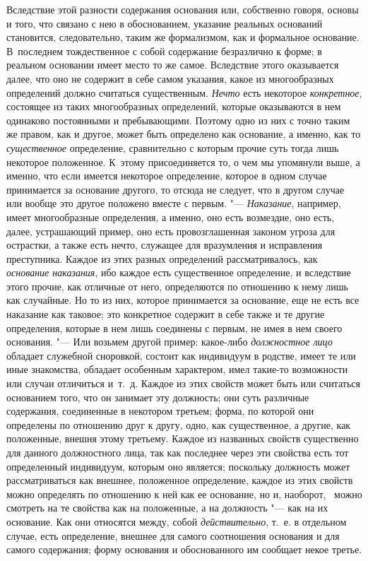 Вследствие этой разности содержания основания или, собственно говоря, основы
и того, что связано с нею в обоснованием, указание реальных оснований
становится, следовательно, таким же формализмом, как и формальное
основание. В~последнем тождественное с собой содержание безразлично к
форме; в реальном основании имеет место то же самое. Вследствие этого
оказывается далее, что оно не содержит в себе самом указания, какое из
многообразных определений должно считаться существенным.
{\em Нечто} есть некоторое
{\em конкретное}, состоящее из таких многообразных
определений, которые оказываются в нем одинаково постоянными и
пребывающими. Поэтому одно из них с точно таким же правом, как и другое,
может быть определено как основание, а именно, как то
{\em существенное} определение, сравнительно с которым
прочие суть тогда лишь некоторое положенное. К~этому присоединяется то, о
чем мы упомянули выше, а именно, что если имеется некоторое определение,
которое в одном случае принимается за основание другого, то отсюда не
следует, что в другом случае или вообще это другое положено вместе с
первым. "--- {\em Наказание}, например, имеет
многообразные определения, а именно, оно есть возмездие, оно есть, далее,
устрашающий пример, оно есть провозглашенная законом угроза для острастки,
а также есть нечто, служащее для вразумления и исправления преступника.
Каждое из этих разных определений рассматривалось, как
{\em основание наказания}, ибо каждое есть существенное
определение, и вследствие этого прочие, как отличные от него, определяются
по отношению к нему лишь как случайные. Но то из них, которое принимается
за основание, еще не есть все наказание как таковое; это конкретное
содержит в себе также и те другие определения, которые в нем лишь соединены
с первым, не имея в нем своего основания. "--- Или возьмем другой пример:
какое-либо {\em должностное лицо} обладает служебной
сноровкой, состоит как индивидуум в родстве, имеет те или иные знакомства,
обладает особенным характером, имел такие-то возможности или случаи
отличиться и~т.~д. Каждое из этих свойств может быть или считаться
основанием того, что он занимает эту должность; они суть различные
содержания, соединенные в некотором третьем; форма, по которой они
определены по отношению друг к другу, одно, как существенное, а другие, как
положенные, внешня этому третьему. Каждое из названных свойств существенно
для данного должностного лица, так как последнее через эти свойства есть
тот определенный индивидуум, которым оно является; поскольку должность
может рассматриваться как внешнее, положенное определение, каждое из этих
свойств можно определять по отношению к ней как ее основание, но и,
наоборот, \ можно смотреть на те свойства как на положенные, а на должность
"--- как на их основание. Как они относятся между, собой
{\em действительно}, т.~е. в отдельном случае, есть
определение, внешнее для самого соотношения основания и для самого
содержания; форму основания и обоснованного им сообщает некое третье.

